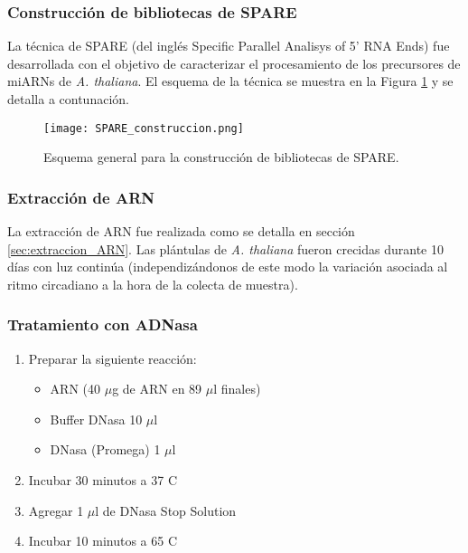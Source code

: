 \subsubsection{Construcción de bibliotecas de SPARE}

La técnica de SPARE (del inglés Specific Parallel Analisys of 5' RNA Ends) fue desarrollada con el objetivo de caracterizar el procesamiento de los precursores de miARNs de \textit{A. thaliana}.
El esquema de la técnica se muestra en la Figura \ref{fig:SPARE_construccion} y se detalla a contunación.

\begin{figure}[htbp!]
	\centering    
	\texttt{[image: SPARE\_construccion.png]}
	\caption[Esquema general para la construcción de bibliotecas de SPARE]{
		Esquema general para la construcción de bibliotecas de SPARE.
	}
	 \label{fig:SPARE_construccion}
\end{figure}

\subsubsection{Extracción de ARN}
La extracción de ARN fue realizada como se detalla en sección \ref{sec:extraccion_ARN}.
Las plántulas de \textit{A. thaliana} fueron crecidas durante 10 días con luz continúa (independizándonos de este modo la variación asociada al ritmo circadiano a la hora de la colecta de muestra).

\subsubsection{Tratamiento con ADNasa}

\begin{enumerate}
	\item Preparar la siguiente reacción:
		\begin{itemize}
			\item ARN (40 $\mu$g de ARN en 89 $\mu$l finales)
			\item Buffer DNasa 10 $\mu$l
			\item DNasa (Promega) 1 $\mu$l
		\end{itemize}
	\item Incubar 30 minutos a 37 \degree C
	\item Agregar 1 $\mu$l de DNasa Stop Solution
	\item Incubar 10 minutos a 65 \degree C
\end{enumerate}

